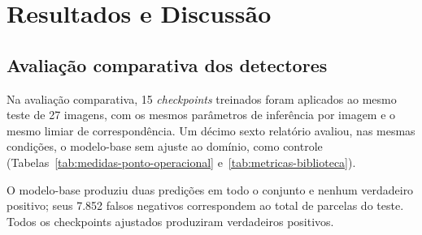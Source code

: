 \chapter{Resultados e Discuss\~ao}
\label{cap:resultados}

\section{Avalia\c{c}\~ao comparativa dos detectores}
\label{sec:avaliacao-comparativa}

Na avalia\c{c}\~ao comparativa, 15 \textit{checkpoints} treinados foram aplicados ao mesmo teste de 27 imagens, com os mesmos par\^ametros de infer\^encia por imagem e o mesmo limiar de correspond\^encia. Um d\'ecimo sexto relat\'orio avaliou, nas mesmas condi\c{c}\~oes, o modelo-base sem ajuste ao dom\'inio, como controle (Tabelas~\ref{tab:medidas-ponto-operacional} e~\ref{tab:metricas-biblioteca}).

O modelo-base produziu duas predi\c{c}\~oes em todo o conjunto e nenhum verdadeiro positivo; seus 7.852 falsos negativos correspondem ao total de parcelas do teste. Todos os checkpoints ajustados produziram verdadeiros positivos.

